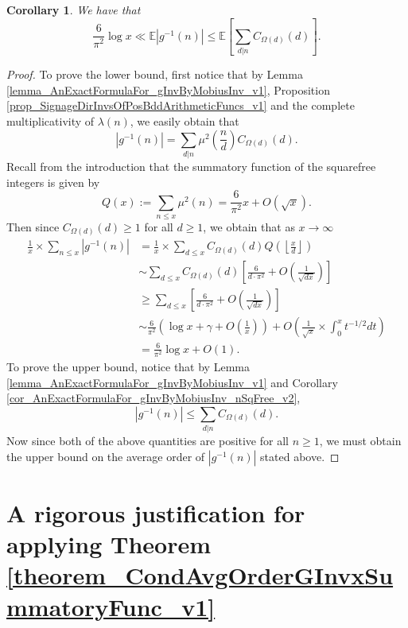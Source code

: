 \documentclass[11pt,reqno,a4letter]{article}
\numberwithin{figure}{section}
\numberwithin{table}{section}
\newcommand{\Floor}[2]{\ensuremath{\left\lfloor \frac{#1}{#2} \right\rfloor}}
\theoremstyle{plain}
\newtheorem{cor}[theorem]{Corollary}
\numberwithin{theorem}{section}
\theoremstyle{definition}
\begin{document}
\begin{cor} 
\label{lemma_BddExpectationOfgInvn} 
We have that 
\[
\frac{6}{\pi^2} \log x \ll \mathbb{E}|g^{-1}(n)| \leq \mathbb{E}\left[\sum_{d|n} C_{\Omega(d)}(d)\right]. 
\]
\end{cor} 
\begin{proof} 
To prove the lower bound, first notice that by 
Lemma \ref{lemma_AnExactFormulaFor_gInvByMobiusInv_v1}, 
Proposition \ref{prop_SignageDirInvsOfPosBddArithmeticFuncs_v1} and the 
complete multiplicativity of $\lambda(n)$, 
we easily obtain that 
\[
|g^{-1}(n)| = \sum_{d|n} \mu^2\left(\frac{n}{d}\right) C_{\Omega(d)}(d). 
\]
Recall from the introduction that the summatory function of the 
squarefree integers is given by 
\[
Q(x) := \sum_{n \leq x} \mu^2(n) = \frac{6}{\pi^2} x + O(\sqrt{x}). 
\]
Then since $C_{\Omega(d)}(d) \geq 1$ for all $d \geq 1$, we obtain that 
as $x \rightarrow \infty$ 
\begin{align*} 
\frac{1}{x} \times \sum_{n \leq x} |g^{-1}(n)| & = \frac{1}{x} \times \sum_{d \leq x} 
     C_{\Omega(d)}(d) Q\left(\Floor{x}{d}\right) \\ 
     & \sim \sum_{d \leq x} C_{\Omega(d)}(d) \left[\frac{6}{d \cdot \pi^2} + O\left(\frac{1}{\sqrt{dx}}\right) 
     \right] \\ 
     & \geq \sum_{d \leq x} \left[\frac{6}{d \cdot \pi^2} + O\left(\frac{1}{\sqrt{dx}}\right)\right] \\ 
     & \sim \frac{6}{\pi^2}\left(\log x + \gamma + O\left(\frac{1}{x}\right)\right) + 
     O\left(\frac{1}{\sqrt{x}} \times \int_0^{x} t^{-1/2} dt\right) \\ 
     & = \frac{6}{\pi^2} \log x + O(1). 
\end{align*} 
To prove the upper bound, notice that by 
Lemma \ref{lemma_AnExactFormulaFor_gInvByMobiusInv_v1} and 
Corollary \ref{cor_AnExactFormulaFor_gInvByMobiusInv_nSqFree_v2}, 
\[
|g^{-1}(n)| \leq \sum_{d|n} C_{\Omega(d)}(d). 
\]
Now since both of the above quantities are positive for all $n \geq 1$, 
we must obtain the upper bound on the average order of $|g^{-1}(n)|$
stated above. 
\end{proof} 

\newpage 
\section{A rigorous justification for applying Theorem \ref{theorem_CondAvgOrderGInvxSummatoryFunc_v1}} 
\label{Section_ProofOfValidityOfAverageOrderLowerBounds} 
\end{document}
